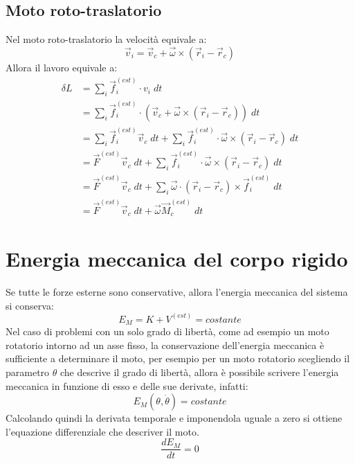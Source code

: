 \documentclass[11pt, a4paper, openright]{book}
\theoremstyle{plain}
\theoremstyle{definition}
\begin{document}
\newpage

\subsection{Moto roto-traslatorio}
Nel moto roto-traslatorio la velocità equivale a:
\begin{equation}
    \vec{v}_i = \vec{v}_c + \vec{\omega} \times (\vec{r}_i - \vec{r}_c)
\end{equation}
Allora il lavoro equivale a:
\begin{align}
    \delta L & = \sum_i \vec{f}_i^{(est)} \cdot v_i \; dt \\
             & = \sum_i \vec{f}_i^{(est)} \cdot (\vec{v}_c + \vec{\omega} \times (\vec{r}_i - \vec{r}_c)) \; dt \\
             & = \sum_i \vec{f}_i^{(est)} \vec{v}_c \; dt+ \sum_i \vec{f}_i^{(est)} \cdot \vec{\omega} \times (\vec{r}_i - \vec{r}_c) \; dt \\
             & = \vec{F}^{(est)} \vec{v}_c \; dt + \sum_i \vec{f}_i^{(est)} \cdot \vec{\omega} \times (\vec{r}_i - \vec{r}_c) \; dt \\
             & = \vec{F}^{(est)} \vec{v}_c \; dt + \sum_i \vec{\omega} \cdot (\vec{r}_i - \vec{r}_c) \times \vec{f}_i^{(est)} \; dt \\
             & = \vec{F}^{(est)} \vec{v}_c \; dt + \vec{\omega} \vec{M}_c^{(est)} \; dt
\end{align}

\section{Energia meccanica del corpo rigido}
Se tutte le forze esterne sono conservative, allora l'energia meccanica del sistema si conserva:
\begin{equation}
    E_M = K + V^{(est)} = costante
\end{equation} 
Nel caso di problemi con un solo grado di libertà, come ad esempio un moto rotatorio intorno ad un asse fisso, la conservazione dell'energia meccanica è sufficiente a determinare il moto, per esempio per un moto rotatorio scegliendo il parametro $\theta$ che descrive il grado di libertà, allora è possibile scrivere l'energia meccanica in funzione di esso e delle sue derivate, infatti:
\begin{equation}
    E_M (\theta, \dot{\theta}) = costante
\end{equation}
Calcolando quindi la derivata temporale e imponendola uguale a zero si ottiene l'equazione differenziale che descriver il moto.
\begin{equation}
    \frac{dE_M}{dt} = 0
\end{equation}  
\end{document}
